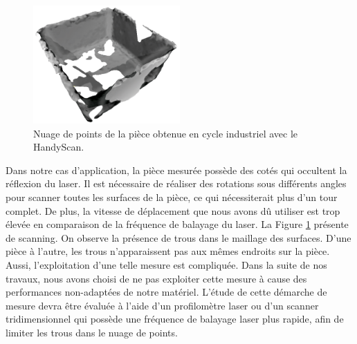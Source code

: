 \begin{figure}[hbtp]
	\centering
	\includegraphics[width=0.5\textwidth]{../Chap2/Figures/online_3d_scan.png}
	\caption{Nuage de points de la pièce obtenue en cycle industriel avec le HandyScan.}
	\label{fig:online_scan_result}
\end{figure}
Dans notre cas d'application, la pièce mesurée possède des cotés qui occultent la réflexion du laser.
Il est nécessaire de réaliser des rotations sous différents angles pour scanner toutes les surfaces de la pièce, ce qui nécessiterait plus d'un tour complet.
De plus, la vitesse de déplacement que nous avons dû utiliser est trop élevée en comparaison de la fréquence de balayage du laser.
La Figure \ref{fig:online_scan_result} présente de scanning.
On observe la présence de trous dans le maillage des surfaces.
D'une pièce à l'autre, les trous n'apparaissent pas aux mêmes endroits sur la pièce.
Aussi, l'exploitation d'une telle mesure est compliquée. 
Dans la suite de nos travaux, nous avons choisi de ne pas exploiter cette mesure à cause des performances non-adaptées de notre matériel.
L'étude de cette démarche de mesure devra être évaluée à l'aide d'un profilomètre laser ou d'un scanner tridimensionnel qui possède une fréquence de balayage laser plus rapide, afin de limiter les trous dans le nuage de points.


